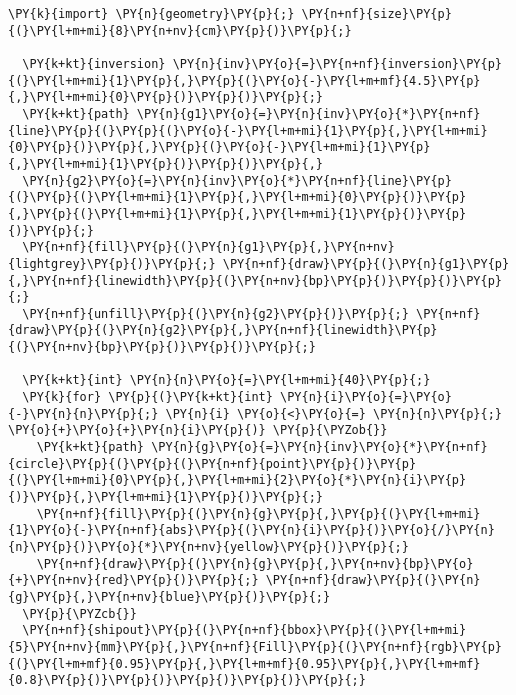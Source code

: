 \begin{Verbatim}[commandchars=\\\{\}]
  \PY{k}{import} \PY{n}{geometry}\PY{p}{;} \PY{n+nf}{size}\PY{p}{(}\PY{l+m+mi}{8}\PY{n+nv}{cm}\PY{p}{)}\PY{p}{;}

  \PY{k+kt}{inversion} \PY{n}{inv}\PY{o}{=}\PY{n+nf}{inversion}\PY{p}{(}\PY{l+m+mi}{1}\PY{p}{,}\PY{p}{(}\PY{o}{-}\PY{l+m+mf}{4.5}\PY{p}{,}\PY{l+m+mi}{0}\PY{p}{)}\PY{p}{)}\PY{p}{;}
  \PY{k+kt}{path} \PY{n}{g1}\PY{o}{=}\PY{n}{inv}\PY{o}{*}\PY{n+nf}{line}\PY{p}{(}\PY{p}{(}\PY{o}{-}\PY{l+m+mi}{1}\PY{p}{,}\PY{l+m+mi}{0}\PY{p}{)}\PY{p}{,}\PY{p}{(}\PY{o}{-}\PY{l+m+mi}{1}\PY{p}{,}\PY{l+m+mi}{1}\PY{p}{)}\PY{p}{)}\PY{p}{,}
  \PY{n}{g2}\PY{o}{=}\PY{n}{inv}\PY{o}{*}\PY{n+nf}{line}\PY{p}{(}\PY{p}{(}\PY{l+m+mi}{1}\PY{p}{,}\PY{l+m+mi}{0}\PY{p}{)}\PY{p}{,}\PY{p}{(}\PY{l+m+mi}{1}\PY{p}{,}\PY{l+m+mi}{1}\PY{p}{)}\PY{p}{)}\PY{p}{;}
  \PY{n+nf}{fill}\PY{p}{(}\PY{n}{g1}\PY{p}{,}\PY{n+nv}{lightgrey}\PY{p}{)}\PY{p}{;} \PY{n+nf}{draw}\PY{p}{(}\PY{n}{g1}\PY{p}{,}\PY{n+nf}{linewidth}\PY{p}{(}\PY{n+nv}{bp}\PY{p}{)}\PY{p}{)}\PY{p}{;}
  \PY{n+nf}{unfill}\PY{p}{(}\PY{n}{g2}\PY{p}{)}\PY{p}{;} \PY{n+nf}{draw}\PY{p}{(}\PY{n}{g2}\PY{p}{,}\PY{n+nf}{linewidth}\PY{p}{(}\PY{n+nv}{bp}\PY{p}{)}\PY{p}{)}\PY{p}{;}

  \PY{k+kt}{int} \PY{n}{n}\PY{o}{=}\PY{l+m+mi}{40}\PY{p}{;}
  \PY{k}{for} \PY{p}{(}\PY{k+kt}{int} \PY{n}{i}\PY{o}{=}\PY{o}{-}\PY{n}{n}\PY{p}{;} \PY{n}{i} \PY{o}{<}\PY{o}{=} \PY{n}{n}\PY{p}{;} \PY{o}{+}\PY{o}{+}\PY{n}{i}\PY{p}{)} \PY{p}{\PYZob{}}
    \PY{k+kt}{path} \PY{n}{g}\PY{o}{=}\PY{n}{inv}\PY{o}{*}\PY{n+nf}{circle}\PY{p}{(}\PY{p}{(}\PY{n+nf}{point}\PY{p}{)}\PY{p}{(}\PY{l+m+mi}{0}\PY{p}{,}\PY{l+m+mi}{2}\PY{o}{*}\PY{n}{i}\PY{p}{)}\PY{p}{,}\PY{l+m+mi}{1}\PY{p}{)}\PY{p}{;}
    \PY{n+nf}{fill}\PY{p}{(}\PY{n}{g}\PY{p}{,}\PY{p}{(}\PY{l+m+mi}{1}\PY{o}{-}\PY{n+nf}{abs}\PY{p}{(}\PY{n}{i}\PY{p}{)}\PY{o}{/}\PY{n}{n}\PY{p}{)}\PY{o}{*}\PY{n+nv}{yellow}\PY{p}{)}\PY{p}{;}
    \PY{n+nf}{draw}\PY{p}{(}\PY{n}{g}\PY{p}{,}\PY{n+nv}{bp}\PY{o}{+}\PY{n+nv}{red}\PY{p}{)}\PY{p}{;} \PY{n+nf}{draw}\PY{p}{(}\PY{n}{g}\PY{p}{,}\PY{n+nv}{blue}\PY{p}{)}\PY{p}{;}
  \PY{p}{\PYZcb{}}
  \PY{n+nf}{shipout}\PY{p}{(}\PY{n+nf}{bbox}\PY{p}{(}\PY{l+m+mi}{5}\PY{n+nv}{mm}\PY{p}{,}\PY{n+nf}{Fill}\PY{p}{(}\PY{n+nf}{rgb}\PY{p}{(}\PY{l+m+mf}{0.95}\PY{p}{,}\PY{l+m+mf}{0.95}\PY{p}{,}\PY{l+m+mf}{0.8}\PY{p}{)}\PY{p}{)}\PY{p}{)}\PY{p}{)}\PY{p}{;}
\end{Verbatim}
